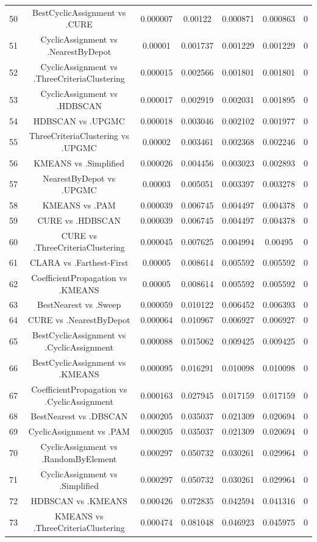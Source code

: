 \documentclass[a4paper,10pt]{article}
\begin{document}
\begin{landscape}
\begin{table}[!htp]
\begin{tabular}{ccccccc}
50&BestCyclicAssignment vs .CURE&0.000007&0.00122&0.000871&0.000863&0\\
51&CyclicAssignment vs .NearestByDepot&0.00001&0.001737&0.001229&0.001229&0\\
52&CyclicAssignment vs .ThreeCriteriaClustering&0.000015&0.002566&0.001801&0.001801&0\\
53&CyclicAssignment vs .HDBSCAN&0.000017&0.002919&0.002031&0.001895&0\\
54&HDBSCAN vs .UPGMC&0.000018&0.003046&0.002102&0.001977&0\\
55&ThreeCriteriaClustering vs .UPGMC&0.00002&0.003461&0.002368&0.002246&0\\
56&KMEANS vs .Simplified&0.000026&0.004456&0.003023&0.002893&0\\
57&NearestByDepot vs .UPGMC&0.00003&0.005051&0.003397&0.003278&0\\
58&KMEANS vs .PAM&0.000039&0.006745&0.004497&0.004378&0\\
59&CURE vs .HDBSCAN&0.000039&0.006745&0.004497&0.004378&0\\
60&CURE vs .ThreeCriteriaClustering&0.000045&0.007625&0.004994&0.00495&0\\
61&CLARA vs .Farthest-First&0.00005&0.008614&0.005592&0.005592&0\\
62&CoefficientPropagation vs .KMEANS&0.00005&0.008614&0.005592&0.005592&0\\
63&BestNearest vs .Sweep&0.000059&0.010122&0.006452&0.006393&0\\
64&CURE vs .NearestByDepot&0.000064&0.010967&0.006927&0.006927&0\\
65&BestCyclicAssignment vs .CyclicAssignment&0.000088&0.015062&0.009425&0.009425&0\\
66&BestCyclicAssignment vs .KMEANS&0.000095&0.016291&0.010098&0.010098&0\\
67&CoefficientPropagation vs .CyclicAssignment&0.000163&0.027945&0.017159&0.017159&0\\
68&BestNearest vs .DBSCAN&0.000205&0.035037&0.021309&0.020694&0\\
69&CyclicAssignment vs .PAM&0.000205&0.035037&0.021309&0.020694&0\\
70&CyclicAssignment vs .RandomByElement&0.000297&0.050732&0.030261&0.029964&0\\
71&CyclicAssignment vs .Simplified&0.000297&0.050732&0.030261&0.029964&0\\
72&HDBSCAN vs .KMEANS&0.000426&0.072835&0.042594&0.041316&0\\
73&KMEANS vs .ThreeCriteriaClustering&0.000474&0.081048&0.046923&0.045975&0\\

\end{tabular}
\end{table}
\end{landscape}
\end{document}
